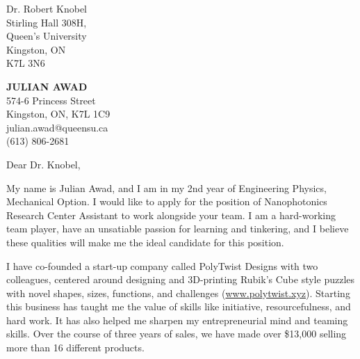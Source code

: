 \documentclass[11pt]{letter} %
\begin{document}
\begin{letter}{Dr. Robert Knobel \\
Stirling Hall 308H, \\
Queen's University \\
Kingston, ON \\
K7L 3N6}

\begin{center}
\textbf{\huge JULIAN AWAD} \\ %
\vspace{1em} %
574-6 Princess Street \\ Kingston, ON, K7L 1C9 \\ julian.awad@queensu.ca \\ (613) 806-2681 %
\end{center}
\hspace{0em}
\signature{Julian Awad} %
\vspace{-1in}
\opening{Dear Dr. Knobel,}

My name is Julian Awad, and I am in my 2nd year of Engineering Physics, Mechanical Option. I would like to apply for the position of Nanophotonics Research Center Assistant to work alongside your team. I am a hard-working team player, have an unsatiable passion for learning and tinkering, and I believe these qualities will make me the ideal candidate for this position.

I have co-founded a start-up company called PolyTwist Designs with two colleagues, centered around designing and 3D-printing Rubik's Cube style puzzles with novel shapes, sizes, functions, and challenges (\url{www.polytwist.xyz}). Starting this business has taught me the value of skills like initiative, resourcefulness, and hard work. It has also helped me sharpen my entrepreneurial mind and teaming skills. Over the course of three years of sales, we have made over \$13,000 selling more than 16 different products.


\end{letter}
\end{document}
